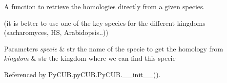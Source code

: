A function to retrieve the homologies directly from a given species. 

(it is better to use one of the key species for the different kingdoms (sacharomyces, HS, Arabidopsis..))


\begin{DoxyParams}{Parameters}
{\em specie} & str the name of the specie to get the homology from \\
\hline
{\em kingdom} & str the kingdom where we can find this specie \\
\hline
\end{DoxyParams}


Referenced by Py\+C\+U\+B.\+py\+C\+U\+B.\+Py\+C\+U\+B.\+\_\+\+\_\+init\+\_\+\+\_\+().

\mbox{\label{class_py_c_u_b_1_1py_c_u_b_1_1_py_c_u_b_a06d83a29ac506b4a9422ef7e64eef0b0}} 
